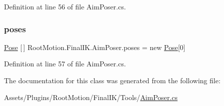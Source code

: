 Definition at line 56 of file Aim\+Poser.\+cs.

\mbox{\label{class_root_motion_1_1_final_i_k_1_1_aim_poser_a84ae0b6317b0209189ff41317a968bce}} 
\subsubsection{\texorpdfstring{poses}{poses}}
{\footnotesize\ttfamily \mbox{\hyperlink{class_root_motion_1_1_final_i_k_1_1_aim_poser_1_1_pose}{Pose}} \mbox{[}$\,$\mbox{]} Root\+Motion.\+Final\+I\+K.\+Aim\+Poser.\+poses = new \mbox{\hyperlink{class_root_motion_1_1_final_i_k_1_1_aim_poser_1_1_pose}{Pose}}\mbox{[}0\mbox{]}}



Definition at line 57 of file Aim\+Poser.\+cs.



The documentation for this class was generated from the following file\+:\begin{DoxyCompactItemize}
\item 
Assets/\+Plugins/\+Root\+Motion/\+Final\+I\+K/\+Tools/\mbox{\hyperlink{_aim_poser_8cs}{Aim\+Poser.\+cs}}\end{DoxyCompactItemize}
